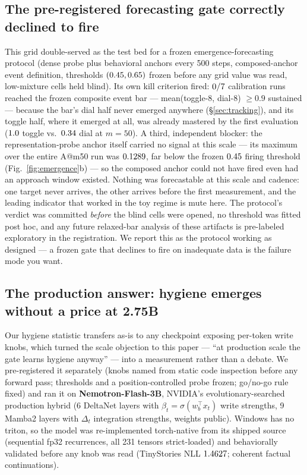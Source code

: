 \documentclass[10pt]{article}
\begin{document}
\subsection{The pre-registered forecasting gate correctly declined to fire}\label{sec:fusion}
This grid double-served as the test bed for a frozen emergence-forecasting protocol (dense probe
plus behavioral anchors every 500 steps, composed-anchor event definition, thresholds
$(0.45,0.65)$ frozen before any grid value was read, low-mixture cells
held blind). Its own kill criterion fired: $0/7$ calibration runs reached the frozen
composite event bar --- mean(toggle-8, dial-8) $\ge0.9$ sustained --- because the bar's dial half
never emerged anywhere (\S\ref{sec:tracking}), and its toggle half, where it emerged at all, was
already mastered by the first evaluation ($1.0$ toggle vs.\
$0.34$ dial at $m{=}50$). A third, independent blocker: the representation-probe
anchor itself carried no signal at this scale --- its maximum over the entire A@m50 run was
$0.1289$, far below the frozen $0.45$ firing threshold
(Fig.~\ref{fig:emergence}b) --- so the composed anchor could not have fired even had an approach
window existed. Nothing was forecastable at this scale and cadence: one target never arrives, the
other arrives before the first measurement, and the leading indicator that worked in the toy regime
is mute here. The protocol's verdict
was committed \emph{before} the blind cells were opened, no threshold was fitted post hoc, and any
future relaxed-bar analysis of these artifacts is pre-labeled exploratory in the registration.
We report this as the protocol working as designed --- a frozen gate that declines to fire on
inadequate data is the failure mode you want.

\subsection{The production answer: hygiene emerges without a price at 2.75B}\label{sec:production}
Our hygiene statistic transfers as-is to any checkpoint exposing per-token write knobs, which
turned the scale objection to this paper --- ``at production scale the gate learns hygiene anyway''
--- into a measurement rather than a debate. We pre-registered it separately (knobs named from
static code inspection before any forward pass; thresholds and a position-controlled probe frozen;
go/no-go rule fixed) and ran it on \textbf{Nemotron-Flash-3B}, NVIDIA's evolutionary-searched
production hybrid (6 DeltaNet layers with $\beta_t=\sigma(w_b^\top x_t)$ write strengths, 9 Mamba2
layers with $\Delta_t$ integration strengths, weights public). Windows has no triton, so the model
was re-implemented torch-native from its shipped source (sequential fp32 recurrences, all 231
tensors strict-loaded) and behaviorally validated before any knob was read (TinyStories NLL
$1.4627$; coherent factual continuations).
\end{document}
